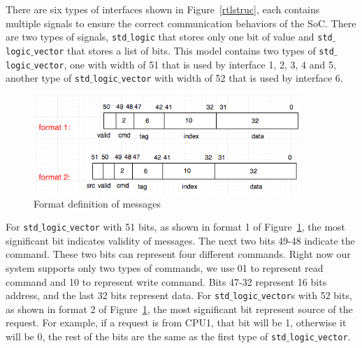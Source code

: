 \documentclass[12pt,frontmatter,copyright,thesis]{usfmanus}
\begin{document}
There are six types of interfaces shown in Figure~\ref{rtlstruc}, each contains multiple signals
to ensure the correct communication behaviors of the SoC.
There are two types of signals, {\tt std$\_$logic} that stores only one bit of value and  {\tt std$\_$logic$\_$vector} that
stores a list of bits. This model contains two types of {\tt std$\_$logic$\_$vector}, one with width of 51 that
is used by interface 1, 2, 3, 4 and 5,  another type of {\tt std$\_$logic$\_$vector}
with width of 52 that is used by interface 6.
  \begin{figure}[h]
\centerline{
\includegraphics[width=4in]{signalline.png}
}
\caption{Format definition of messages}
\label{sigline}
\end{figure}
For {\tt std$\_$logic$\_$vector} with 51 bits, as shown in format 1 of Figure~\ref{sigline},
the most significant bit indicates validity of messages.
The next
two bits 49-48 indicate the command. These two bits can represent four different commands.
Right now our
system supports only two types of commands,
we use 01 to represent read command and 10 to represent write command.
Bits 47-32 represent 16 bits address, and the last 32 bits represent data.
For {\tt std$\_$logic$\_$vector}s with 52 bits, as shown in format 2 of Figure~\ref{sigline},
the most significant bit represent source of the request. For example, if a request is from CPU1, that bit
will be 1, otherwise it will be 0, the rest of the bits are the same as the first type of {\tt std$\_$logic$\_$vector}.

\end{document}
